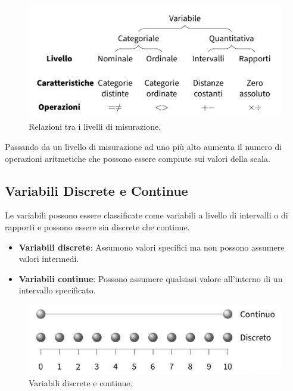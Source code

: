 \documentclass[
  letterpaper,
]{krantz}
\providecommand{\tightlist}{%
  \setlength{\itemsep}{0pt}\setlength{\parskip}{0pt}}\usepackage{longtable,booktabs,array}
\begin{document}
\begin{figure}[H]

{\centering \includegraphics[width=0.65\linewidth,height=\textheight,keepaspectratio]{chapters/key_notions/../../figures/misurazione_1.png}

}

\caption{Relazioni tra i livelli di misurazione.}

\end{figure}%

Passando da un livello di misurazione ad uno più alto aumenta il numero
di operazioni aritmetiche che possono essere compiute sui valori della
scala.

\subsection{Variabili Discrete e
Continue}\label{variabili-discrete-e-continue}

Le variabili possono essere classificate come variabili a livello di
intervalli o di rapporti e possono essere sia discrete che continue.

\begin{itemize}
\tightlist
\item
  \textbf{Variabili discrete}: Assumono valori specifici ma non possono
  assumere valori intermedi.
\item
  \textbf{Variabili continue}: Possono assumere qualsiasi valore
  all'interno di un intervallo specificato.
\end{itemize}

\begin{figure}[H]

{\centering \includegraphics[width=0.65\linewidth,height=\textheight,keepaspectratio]{chapters/key_notions/../../figures/misurazione_3.png}

}

\caption{Variabili discrete e continue.}

\end{figure}%
\end{document}
